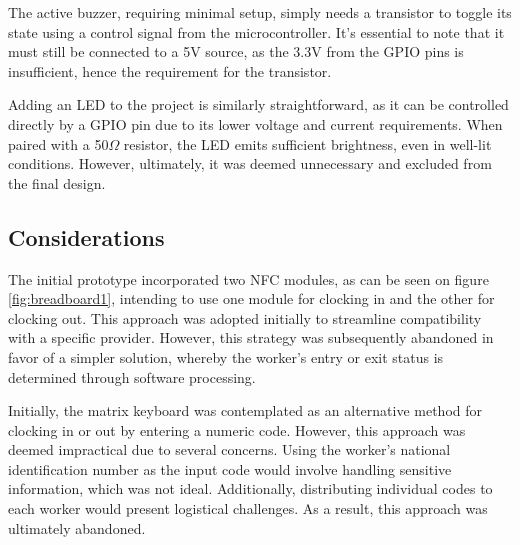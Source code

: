 The active buzzer, requiring minimal setup, simply needs a transistor to toggle its state using a control signal from the 
microcontroller. It's essential to note that it must still be connected to a 5V source, as the 3.3V from the GPIO pins is 
insufficient, hence the requirement for the transistor.

Adding an LED to the project is similarly straightforward, as it can be controlled directly by a GPIO pin due to its lower 
voltage and current requirements. When paired with a 50$\Omega$ resistor, the LED emits sufficient brightness, even in 
well-lit conditions. However, ultimately, it was deemed unnecessary and excluded from the final design.


\subsection{Considerations}

The initial prototype incorporated two NFC modules, as can be seen on figure \ref{fig:breadboard1}, intending to use one 
module for clocking in and the other for clocking out. This approach was adopted initially to streamline compatibility 
with a specific provider. However, this strategy was subsequently abandoned in favor of a simpler solution, whereby the 
worker's entry or exit status is determined through software processing.

Initially, the matrix keyboard was contemplated as an alternative method for clocking in or out by entering a numeric 
code. However, this approach was deemed impractical due to several concerns. Using the worker's national identification 
number as the input code would involve handling sensitive information, which was not ideal. Additionally, distributing 
individual codes to each worker would present logistical challenges. As a result, this approach was ultimately abandoned.





